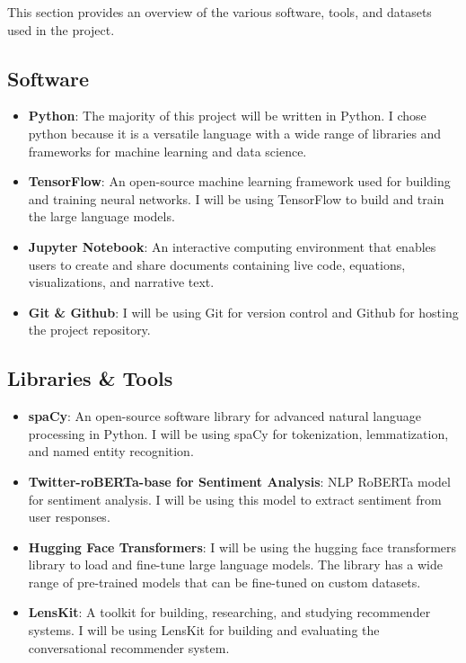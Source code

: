 
This section provides an overview of the various software, tools, and datasets used in the project.

\subsection{Software}
\begin{itemize}
    \item \textbf{Python}: The majority of this project will be written in Python. I chose python because it is a versatile language with a wide range of libraries and frameworks for machine learning and data science.
    \item \textbf{TensorFlow}: An open-source machine learning framework used for building and training neural networks. I will be using TensorFlow to build and train the large language models.
    \item \textbf{Jupyter Notebook}: An interactive computing environment that enables users to create and share documents containing live code, equations, visualizations, and narrative text.
    \item \textbf{Git \& Github}: I will be using Git for version control and Github for hosting the project repository.
\end{itemize}

\subsection{Libraries \& Tools}
\begin{itemize}
    \item \textbf{spaCy}: An open-source software library for advanced natural language processing in Python. I will be using spaCy for tokenization, lemmatization, and named entity recognition.
    \cite{Honnibal_spaCy_Industrial-strength_Natural_2020}
    \item \textbf{Twitter-roBERTa-base for Sentiment Analysis}: NLP RoBERTa model for sentiment analysis. I will be using this model to extract sentiment from user responses.
    \cite{camacho-collados-etal-2022-tweetnlp}
    \item \textbf{Hugging Face Transformers}: I will be using the hugging face transformers library to load and fine-tune large language models. The library has a wide range of pre-trained models that can be fine-tuned on custom datasets.
    \cite{wolf-etal-2020-transformers}
    \item \textbf{LensKit}: A toolkit for building, researching, and studying recommender systems. I will be using LensKit for building and evaluating the conversational recommender system.
    \cite{ekstrand_2020_lenskit}
\end{itemize}

